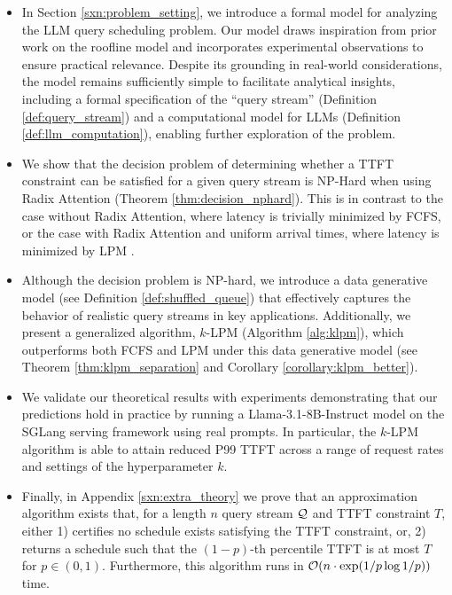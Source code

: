 \begin{itemize}
    \item In Section \ref{sxn:problem_setting}, we introduce a formal model for analyzing the LLM query scheduling problem. Our model draws inspiration from prior work on the roofline model \cite{imai2024predicting} and incorporates experimental observations to ensure practical relevance. Despite its grounding in real-world considerations, the model remains sufficiently simple to facilitate analytical insights, including a formal specification of the ``query stream'' (Definition \ref{def:query_stream}) and a computational model for LLMs (Definition \ref{def:llm_computation}), enabling further exploration of the problem.
    \item We show that the decision problem of determining whether a TTFT constraint can be satisfied for a given query stream is NP-Hard when using Radix Attention (Theorem \ref{thm:decision_nphard}). This is in contrast to the case without Radix Attention, where latency is trivially minimized by FCFS, or the case with Radix Attention and uniform arrival times, where latency is minimized by LPM \cite{zheng2024sglang}.
    \item Although the decision problem is NP-hard, we introduce a data generative model (see Definition \ref{def:shuffled_queue}) that effectively captures the behavior of realistic query streams in key applications. Additionally, we present a generalized algorithm, $k$-LPM (Algorithm \ref{alg:klpm}), which outperforms both FCFS and LPM under this data generative model (see Theorem \ref{thm:klpm_separation} and Corollary \ref{corollary:klpm_better}).
    \item We validate our theoretical results with experiments demonstrating that our predictions hold in practice by running a Llama-3.1-8B-Instruct model on the SGLang serving framework using real prompts.
    In particular, the $k$-LPM algorithm is able to attain reduced P99 TTFT across a range of request rates and settings of the hyperparameter $k$. 
    \item Finally, in Appendix \ref{sxn:extra_theory} we prove that an approximation algorithm exists that, for a length $n$ query stream $\mathcal{Q}$ and TTFT constraint $T$, either 1) certifies no schedule exists satisfying the TTFT constraint, or, 2) returns a schedule such that the $(1-p)$-th percentile TTFT is at most $T$ for $p \in (0,1)$. Furthermore, this algorithm runs in $\mathcal{O}(n \cdot \exp(1/p \log 1/p))$ time.
\end{itemize}


